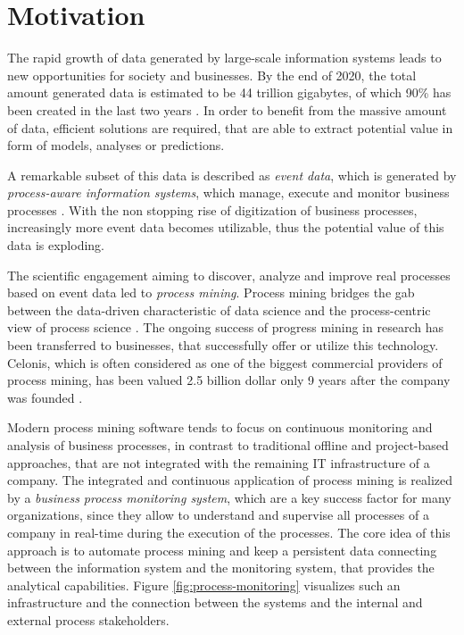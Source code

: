 
\section{Motivation}

The rapid growth of data generated by large-scale information systems leads to new opportunities for  society and businesses. 
By the end of 2020, the total amount generated data is estimated to be 44 trillion gigabytes, of which 90\% has been created in the last two years \cite{datagrowth}.
In order to benefit from the massive amount of data, efficient solutions are required, that are able to extract potential value in form of models, analyses or predictions.

A remarkable subset of this data is described as \textit{event data}, which is generated by \textit{process-aware information systems}, which manage, execute and monitor business processes \cite{DBLP:journals/topnoc/Aalst09}.
With the non stopping rise of digitization of business processes, increasingly more event data becomes utilizable, thus the potential value of this data is exploding.

The scientific engagement aiming to discover, analyze and improve real processes based on event data led to \textit{process mining}. Process mining bridges the gab between the data-driven characteristic of data science and the process-centric view of process science \cite{DBLP:books/sp/Aalst16}.
The ongoing success of progress mining in research has been transferred to businesses, that successfully offer or utilize this technology.
Celonis, which is often considered as one of the biggest commercial providers of process mining, has been valued 2.5 billion dollar only 9 years after the company was founded \cite{celonis}.

Modern process mining software tends to focus on continuous monitoring and analysis of business processes, in contrast to traditional offline and project-based approaches, that are not integrated with the remaining IT infrastructure of a company.
The integrated and continuous application of process mining is realized by a \textit{business process monitoring system}, which are a key success factor for many organizations, since they allow to understand and supervise all processes of a company in real-time during the execution of the processes.
The core idea of this approach is to automate process mining and keep a persistent data connecting between the information system and the monitoring system, that provides the analytical capabilities.
Figure \ref{fig:process-monitoring} visualizes such an infrastructure and the connection between the systems and the internal and external process stakeholders.

